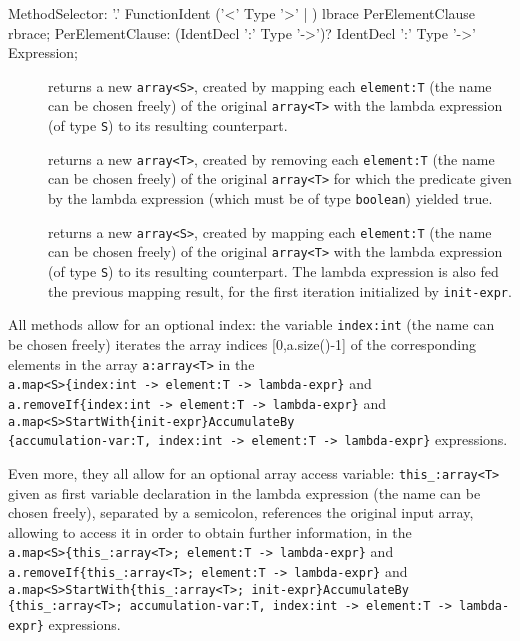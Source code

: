 \begin{rail}
  MethodSelector: '.' FunctionIdent ('<' Type '>' | ) lbrace PerElementClause rbrace;
  PerElementClause: (IdentDecl ':' Type '->')? IdentDecl ':' Type '->' Expression;
\end{rail}

\begin{description}
\item[] returns a new \texttt{array<S>},
   created by mapping each \texttt{element:T} (the name can be chosen freely) of the original \texttt{array<T>} with the lambda expression (of type \texttt{S}) to its resulting counterpart.
\item[] returns a new \texttt{array<T>},
   created by removing each \texttt{element:T} (the name can be chosen freely) of the original \texttt{array<T>} for which the predicate given by the lambda expression (which must be of type \texttt{boolean}) yielded true.
\item[]
 returns a new \texttt{array<S>},
   created by mapping each \texttt{element:T} (the name can be chosen freely) of the original \texttt{array<T>} with the lambda expression (of type \texttt{S}) to its resulting counterpart.
	The lambda expression is also fed the previous mapping result, for the first iteration initialized by \texttt{init-expr}.
\end{description}

All methods allow for an optional index: the variable \texttt{index:int} (the name can be chosen freely) iterates the array indices [0,a.size()-1] of the corresponding elements in the array \texttt{a:array<T>} in the\\
\verb#a.map<S>{index:int -> element:T -> lambda-expr}# and\\
\verb#a.removeIf{index:int -> element:T -> lambda-expr}# and\\
\verb#a.map<S>StartWith{init-expr}AccumulateBy#\\
\verb#{accumulation-var:T, index:int -> element:T -> lambda-expr}#
expressions.

Even more, they all allow for an optional array access variable: \verb#this_:array<T># given as first variable declaration in the lambda expression (the name can be chosen freely), separated by a semicolon, references the original input array, allowing to access it in order to obtain further information, in the\\
\verb#a.map<S>{this_:array<T>; element:T -> lambda-expr}# and\\
\verb#a.removeIf{this_:array<T>; element:T -> lambda-expr}# and\\
\verb#a.map<S>StartWith{this_:array<T>; init-expr}AccumulateBy#\\
\verb#{this_:array<T>; accumulation-var:T, index:int -> element:T -> lambda-expr}# expressions.

